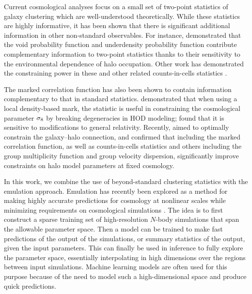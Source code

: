 Current cosmological analyses focus on a small set of two-point statistics of galaxy clustering which are well-understood theoretically.
While these statistics are highly informative, it has been shown that there is significant additional information in other non-standard observables.
For instance, \cite{Tinker2006, Tinker2008} demonstrated that the void probability function and underdensity probability function contribute complementary information to two-point statistics thanks to their sensitivity to the environmental dependence of halo occupation.
Other work has demonstrated the constraining power in these and other related counts-in-cells statistics \citep{WalshTinker2019, Wang2019, Beltz-Mohrmann2020}.

The marked correlation function \citep{Sheth2004} has also been shown to contain information complementary to that in standard statistics.
\cite{WhitePadmanabhan2009} demonstrated that when using a local density-based mark, the statistic is useful in constraining the cosmological parameter $\sigma_\mathrm{8}$ by breaking degeneracies in HOD modeling; \cite{White2016} found that it is sensitive to modifications to general relativity.
Recently, \cite{Szewciw2022} aimed to optimally constrain the galaxy--halo connection, and confirmed that including the marked correlation function, as well as counts-in-cells statistics and others including the group multiplicity function and group velocity dispersion, significantly improve constraints on halo model parameters at fixed cosmology.

In this work, we combine the use of beyond-standard clustering statistics with the emulation approach.
Emulation has recently been explored as a method for making highly accurate predictions for cosmology at nonlinear scales while minimizing requirements on cosmological simulations \citep{Heitmann2009, Heitmann2010, Lawrence2010}.
The idea is to first construct a sparse training set of high-resolution $N$-body simulations that span the allowable parameter space.
Then a model can be trained to make fast predictions of the output of the simulations, or summary statistics of the output, given the input parameters.
This can finally be used in inference to fully explore the parameter space, essentially interpolating in high dimensions over the regions between input simulations.
Machine learning models are often used for this purpose because of the need to model such a high-dimensional space and produce quick predictions.

